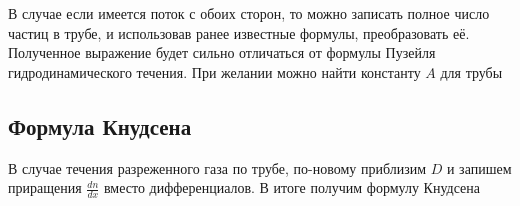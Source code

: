 \documentclass[a4paper, 14pt]{article}
\begin{document}
    В случае если имеется поток с обоих сторон, то можно записать полное число частиц в трубе, и использовав ранее
    известные формулы, преобразовать её.
    Полученное выражение будет сильно отличаться от формулы Пузейля гидродинамического течения.
    При желании можно найти константу $A$ для трубы
    
    \subsection{Формула Кнудсена}
    
    В случае течения разреженного газа по трубе, по-новому приблизим $D$ и запишем приращения $\frac{dn}{dx}$ вместо
    дифференциалов.
    В итоге получим формулу Кнудсена
\end{document}

